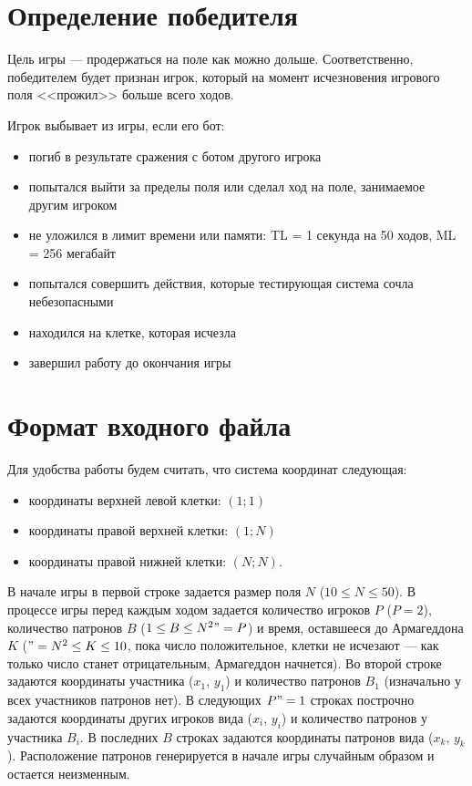 \documentclass[a4paper,12pt]{article}
\begin{document}
\section{Определение победителя}
Цель игры --- продержаться на поле как можно дольше. Соответственно, победителем будет признан игрок, который на момент исчезновения игрового поля <<прожил>> больше всего ходов.
\begin{flushleft}
Игрок выбывает из игры, если его бот:
\begin{itemize}
\item погиб в результате сражения с ботом другого игрока
\item попытался выйти за пределы поля или сделал ход на поле, занимаемое другим игроком
\item не уложился в лимит времени или памяти:
TL = 1 секунда на 50 ходов, ML = 256 мегабайт
\item попытался совершить действия, которые тестирующая система сочла небезопасными
\item находился на клетке, которая исчезла
\item завершил работу до окончания игры
\end{itemize}
\end{flushleft}

\section{Формат входного файла}
Для удобства работы будем считать, что система координат следующая:
\begin{itemize}
\item координаты верхней левой клетки: $(1;1)$
\item координаты правой верхней клетки: $(1;N)$
\item координаты правой нижней клетки: $(N;N)$.
\end{itemize}

\begin{flushleft}
В начале игры в первой строке задается размер поля $N$ ($10 \leq N \leq 50$). В процессе игры перед каждым ходом задается количество игроков $P$ ($P = 2$), количество патронов $B$ ($1 \leq B \leq N^2"=P$) и время, оставшееся до Армагеддона $K$ ($"=N^2 \leq K \leq 10$, пока число положительное, клетки не исчезают --- как только число станет отрицательным, Армагеддон начнется).
Во второй строке задаются координаты участника ($x_1$, $y_1$) и количество патронов $B_1$ (изначально у всех участников патронов нет).
В следующих $P"=1$ строках построчно задаются координаты других игроков вида ($x_i$, $y_i$) и количество патронов у участника $B_i$.
В последних $B$ строках задаются координаты патронов вида ($x_k$, $y_k$). Расположение патронов генерируется в начале игры случайным образом и остается неизменным.
\end{flushleft}
\end{document}
